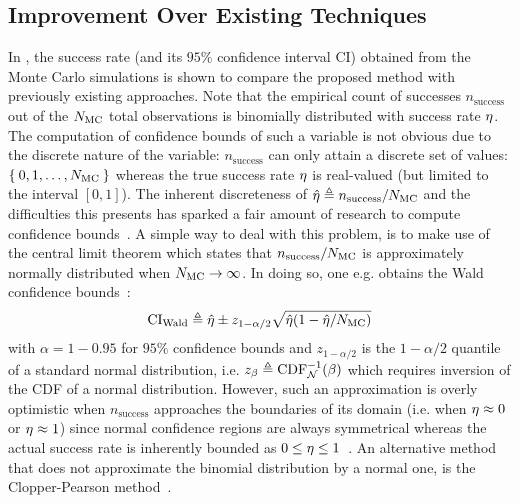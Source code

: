 \subsection{Improvement Over Existing Techniques}

In , the success rate (and its $95\%$ confidence interval $\mathrm{CI}$) obtained from the Monte Carlo simulations is shown to compare the proposed method with previously existing approaches.
Note that the empirical count of successes $n_{\mathrm{success}}$ out of the $N_{\mathrm{MC}}$ total observations is binomially distributed with success rate $\eta$.
The computation of confidence bounds of such a variable is not obvious due to the discrete nature of the variable: $n_{\mathrm{success}}$ can only attain a discrete set of values: $\Set{0,1,\ldots, N_{\ensuremath{\mathrm{MC}}}}$ whereas the true success rate $\eta$ is real-valued (but limited to the interval $[0,1]$).
The inherent discreteness of $\hat{\eta} \triangleq n_{\mathrm{success}}/N_{\mathrm{MC}}$ and the difficulties this presents has sparked a fair amount of research to compute confidence bounds~\citep{Barnard1947Significance,Mato1997,Ross2003,Clopper1934}.
A simple way to deal with this problem, is to make use of the central limit theorem which states that $n_{\mathrm{success}}/N_{\mathrm{MC}}$ is approximately normally distributed when $N_{\mathrm{MC}} \to \infty$.
In doing so, one e.g. obtains the Wald confidence bounds~\citep{Ross2003}:
\begin{equation}
\mathrm{CI}_{\mathrm{Wald}} \triangleq \hat{\eta} \pm z_{1-\alpha/2} \sqrt{\hat{\eta} (1-\hat{\eta}/N_{\mathrm{MC}})}
\end{equation}
with $\alpha = 1 - 0.95$ for $95\%$ confidence bounds and $z_{1-\alpha/2}$ is the $1-\alpha/2$ quantile of a standard normal distribution, i.e. $z_{\beta} \triangleq \mathrm{CDF}_{\operatorname{\mathcal{N}}}^{-1}(\beta)$
which requires inversion of the \gls{CDF} of a normal distribution.
However, such an approximation is overly optimistic when $n_{\mathrm{success}}$ approaches the boundaries of its domain (i.e. when $\eta \approx 0$ or $\eta \approx 1$) since normal confidence regions are always symmetrical whereas the actual success rate is inherently bounded as $0 \leq \eta \leq 1$~\citep{Ross2003}.
An alternative method that does not approximate the binomial distribution by a normal one, is the Clopper-Pearson method~\citep{Clopper1934}.
